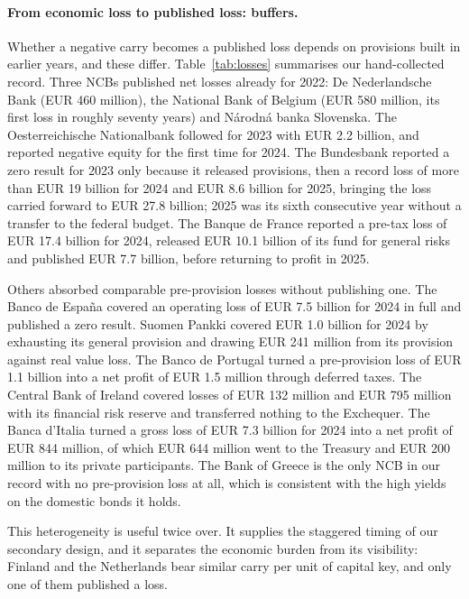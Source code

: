 \documentclass[11pt]{article}
\theoremstyle{plain}
\begin{document}
\paragraph{From economic loss to published loss: buffers.}
Whether a negative carry becomes a published loss depends on provisions built in earlier years, and these differ. Table~\ref{tab:losses} summarises our hand-collected record. Three NCBs published net losses already for 2022: De Nederlandsche Bank (EUR 460 million), the National Bank of Belgium (EUR 580 million, its first loss in roughly seventy years) and N\'arodn\'a banka Slovenska. The Oesterreichische Nationalbank followed for 2023 with EUR 2.2 billion, and reported negative equity for the first time for 2024. The Bundesbank reported a zero result for 2023 only because it released provisions, then a record loss of more than EUR 19 billion for 2024 and EUR 8.6 billion for 2025, bringing the loss carried forward to EUR 27.8 billion; 2025 was its sixth consecutive year without a transfer to the federal budget. The Banque de France reported a pre-tax loss of EUR 17.4 billion for 2024, released EUR 10.1 billion of its fund for general risks and published EUR 7.7 billion, before returning to profit in 2025.

Others absorbed comparable pre-provision losses without publishing one. The Banco de Espa\~na covered an operating loss of EUR 7.5 billion for 2024 in full and published a zero result. Suomen Pankki covered EUR 1.0 billion for 2024 by exhausting its general provision and drawing EUR 241 million from its provision against real value loss. The Banco de Portugal turned a pre-provision loss of EUR 1.1 billion into a net profit of EUR 1.5 million through deferred taxes. The Central Bank of Ireland covered losses of EUR 132 million and EUR 795 million with its financial risk reserve and transferred nothing to the Exchequer. The Banca d'Italia turned a gross loss of EUR 7.3 billion for 2024 into a net profit of EUR 844 million, of which EUR 644 million went to the Treasury and EUR 200 million to its private participants. The Bank of Greece is the only NCB in our record with no pre-provision loss at all, which is consistent with the high yields on the domestic bonds it holds.

This heterogeneity is useful twice over. It supplies the staggered timing of our secondary design, and it separates the economic burden from its visibility: Finland and the Netherlands bear similar carry per unit of capital key, and only one of them published a loss.
\end{document}
